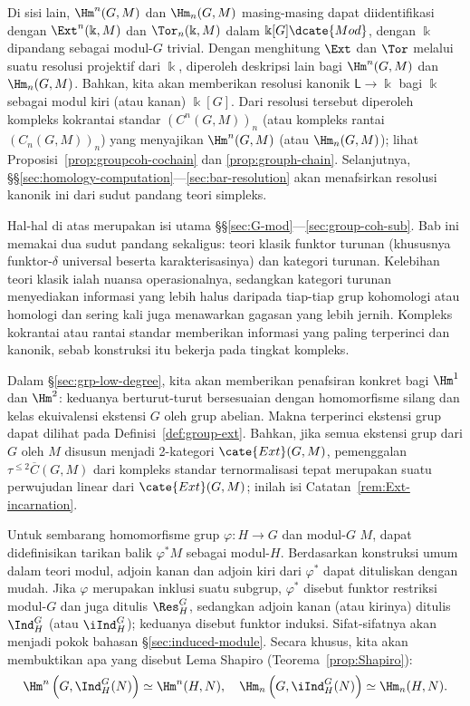 Di sisi lain, $\Hm^n(G,M)$ dan $\Hm_n(G,M)$ masing-masing dapat diidentifikasi
dengan $\Ext^n(\Bbbk,M)$ dan $\Tor_n(\Bbbk,M)$ dalam
$\Bbbk[G]\dcate{Mod}$, dengan $\Bbbk$ dipandang sebagai modul-$G$ trivial.
Dengan menghitung $\Ext$ dan $\Tor$ melalui suatu resolusi projektif dari
$\Bbbk$, diperoleh deskripsi lain bagi $\Hm^n(G,M)$ dan $\Hm_n(G,M)$. Bahkan,
kita akan memberikan resolusi kanonik
$\mathsf{L}\to\Bbbk$ bagi $\Bbbk$ sebagai modul kiri (atau kanan)
$\Bbbk[G]$. Dari resolusi tersebut diperoleh kompleks kokrantai standar
$(C^n(G,M))_n$ (atau kompleks rantai $(C_n(G,M))_n$) yang menyajikan
$\Hm^n(G,M)$ (atau $\Hm_n(G,M)$); lihat
Proposisi~\ref{prop:groupcoh-cochain} dan \ref{prop:grouph-chain}. Selanjutnya,
\S\S\ref{sec:homology-computation}---\ref{sec:bar-resolution} akan menafsirkan
resolusi kanonik ini dari sudut pandang teori simpleks.

Hal-hal di atas merupakan isi utama
\S\S\ref{sec:G-mod}---\ref{sec:group-coh-sub}. Bab ini memakai dua sudut
pandang sekaligus: teori klasik funktor turunan (khususnya funktor-$\delta$
universal beserta karakterisasinya) dan kategori turunan. Kelebihan teori
klasik ialah nuansa operasionalnya, sedangkan kategori turunan menyediakan
informasi yang lebih halus daripada tiap-tiap grup kohomologi atau homologi dan
sering kali juga menawarkan gagasan yang lebih jernih. Kompleks kokrantai atau
rantai standar memberikan informasi yang paling terperinci dan kanonik, sebab
konstruksi itu bekerja pada tingkat kompleks.

Dalam \S\ref{sec:grp-low-degree}, kita akan memberikan penafsiran konkret bagi
$\Hm^1$ dan $\Hm^2$: keduanya berturut-turut bersesuaian dengan homomorfisme
silang dan kelas ekuivalensi ekstensi $G$ oleh grup abelian. Makna terperinci
ekstensi grup dapat dilihat pada Definisi~\ref{def:group-ext}. Bahkan, jika
semua ekstensi grup dari $G$ oleh $M$ disusun menjadi 2-kategori
$\cate{Ext}(G,M)$, pemenggalan
$\tau^{\leq2}\overline{C}(G,M)$ dari kompleks standar ternormalisasi tepat
merupakan suatu perwujudan linear dari $\cate{Ext}(G,M)$; inilah isi
Catatan~\ref{rem:Ext-incarnation}.

Untuk sembarang homomorfisme grup $\varphi:H\to G$ dan modul-$G$ $M$, dapat
didefinisikan tarikan balik $\varphi^*M$ sebagai modul-$H$. Berdasarkan
konstruksi umum dalam teori modul, adjoin kanan dan adjoin kiri dari
$\varphi^*$ dapat dituliskan dengan mudah. Jika $\varphi$ merupakan inklusi
suatu subgrup, $\varphi^*$ disebut funktor restriksi modul-$G$ dan juga ditulis
$\Res^G_H$, sedangkan adjoin kanan (atau kirinya) ditulis $\Ind^G_H$ (atau
$\iInd^G_H$); keduanya disebut funktor induksi. Sifat-sifatnya akan menjadi
pokok bahasan \S\ref{sec:induced-module}. Secara khusus, kita akan membuktikan
apa yang disebut Lema Shapiro (Teorema~\ref{prop:Shapiro}):
\[ \Hm^n\left(G, \Ind^G_H(N)\right) \simeq \Hm^n(H, N), \quad \Hm_n\left(G, \iInd^G_H(N)\right) \simeq \Hm_n(H, N). \]

